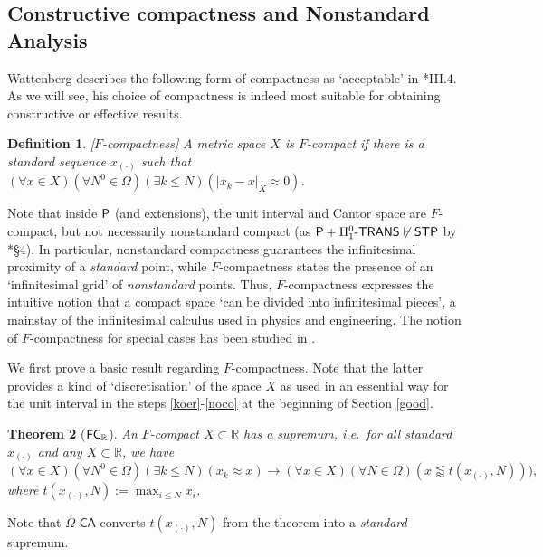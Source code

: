 \documentclass[reqno]{amsart}
\newtheorem{thm}{Theorem}
\newtheorem{defi}[thm]{Definition}
\def\bdefi{\begin{defi}\rm}
\def\edefi{\end{defi}}
\def\STP{\textup{\textsf{STP}}}
\def\P{\textup{\textsf{P}}}
\def\R{{\mathbb  R}}
\def\R{{\mathbb{R}}}
\def\di{\rightarrow}
\def\paai{\Pi_{1}^{0}\textup{-\textsf{TRANS}}}
\def\FC{\textup{\textsf{FC}}}
\numberwithin{equation}{section}
\numberwithin{thm}{section}
\begin{document}
\subsection{Constructive compactness and Nonstandard Analysis}\label{compa}
Wattenberg describes the following form of compactness as `acceptable' in \cite{watje}*{III.4}.  As we will see, his choice of compactness is indeed most suitable for obtaining constructive or effective results.  
\bdefi[$F$-compactness]
A metric space $X$ is \emph{$F$-compact} if there is a standard sequence $x_{(\cdot)}$ such that $(\forall x\in X)(\forall N^{0}\in \Omega) (\exists k\leq N)(|x_{k}-x|_{X}\approx 0)$.
\edefi
Note that inside $\P$ (and extensions), the unit interval and Cantor space are $F$-compact, but not necessarily nonstandard compact (as $\P+\paai\not\vdash \STP$ by \cite{dagsam}*{\S4}).  In particular, nonstandard compactness guarantees
the infinitesimal proximity of a \emph{standard} point, while $F$-compactness states the presence of an `infinitesimal grid' of \emph{nonstandard} points.  Thus, $F$-compactness expresses the intuitive notion that a compact space `can be divided into infinitesimal pieces', a mainstay of the infinitesimal calculus used in physics and engineering.     
The notion of $F$-compactness for special cases has been studied in \cite{sambon}.  

\medskip

We first prove a basic result regarding $F$-compactness.  Note that the latter provides a kind of `discretisation' 
of the space $X$ as used in an essential way for the unit interval in the steps \eqref{koer}-\eqref{noco} at the beginning of Section \ref{good}.  
\begin{thm}[$\FC_{\R}$]
An $F$-compact $X\subset \R$ has a supremum, i.e.\ for all standard $x_{(\cdot)}$ and any $X\subset \R$, we have
\[
(\forall x\in X)(\forall N^{0}\in \Omega) (\exists k\leq N)(x_{k}\approx x) \di  (\forall x\in X)(\forall N\in \Omega)(x\lessapprox t(x_{(\cdot)}, N))),
\]
where $t(x_{(\cdot)}, N ):= \max_{i\leq N}x_{i}$.  
\end{thm}\noindent
Note that $\Omega\textsf{-CA}$ converts $t(x_{(\cdot)}, N)$ from the theorem into a \emph{standard} supremum.  

\medskip
\end{document}
